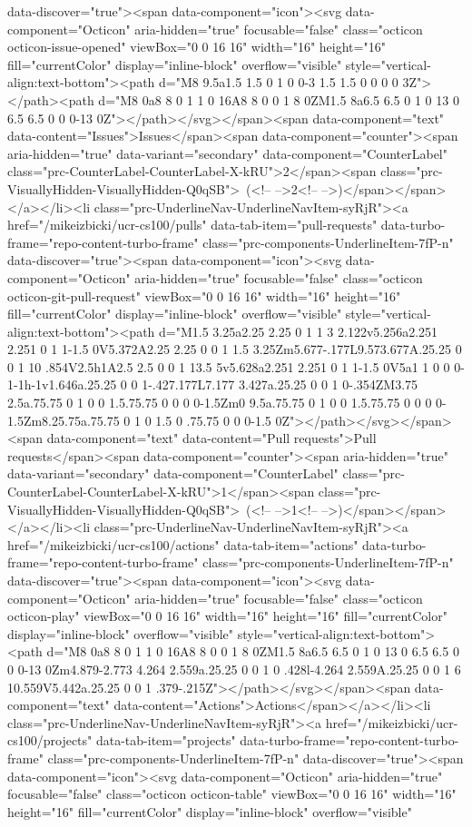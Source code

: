 data-discover="true"><span data-component="icon"><svg data-component="Octicon" aria-hidden="true" focusable="false" class="octicon octicon-issue-opened" viewBox="0 0 16 16" width="16" height="16" fill="currentColor" display="inline-block" overflow="visible" style="vertical-align:text-bottom"><path d="M8 9.5a1.5 1.5 0 1 0 0-3 1.5 1.5 0 0 0 0 3Z"></path><path d="M8 0a8 8 0 1 1 0 16A8 8 0 0 1 8 0ZM1.5 8a6.5 6.5 0 1 0 13 0 6.5 6.5 0 0 0-13 0Z"></path></svg></span><span data-component="text" data-content="Issues">Issues</span><span data-component="counter"><span aria-hidden="true" data-variant="secondary" data-component="CounterLabel" class="prc-CounterLabel-CounterLabel-X-kRU">2</span><span class="prc-VisuallyHidden-VisuallyHidden-Q0qSB"> (<!-- -->2<!-- -->)</span></span></a></li><li class="prc-UnderlineNav-UnderlineNavItem-syRjR"><a href="/mikeizbicki/ucr-cs100/pulls" data-tab-item="pull-requests" data-turbo-frame="repo-content-turbo-frame" class="prc-components-UnderlineItem-7fP-n" data-discover="true"><span data-component="icon"><svg data-component="Octicon" aria-hidden="true" focusable="false" class="octicon octicon-git-pull-request" viewBox="0 0 16 16" width="16" height="16" fill="currentColor" display="inline-block" overflow="visible" style="vertical-align:text-bottom"><path d="M1.5 3.25a2.25 2.25 0 1 1 3 2.122v5.256a2.251 2.251 0 1 1-1.5 0V5.372A2.25 2.25 0 0 1 1.5 3.25Zm5.677-.177L9.573.677A.25.25 0 0 1 10 .854V2.5h1A2.5 2.5 0 0 1 13.5 5v5.628a2.251 2.251 0 1 1-1.5 0V5a1 1 0 0 0-1-1h-1v1.646a.25.25 0 0 1-.427.177L7.177 3.427a.25.25 0 0 1 0-.354ZM3.75 2.5a.75.75 0 1 0 0 1.5.75.75 0 0 0 0-1.5Zm0 9.5a.75.75 0 1 0 0 1.5.75.75 0 0 0 0-1.5Zm8.25.75a.75.75 0 1 0 1.5 0 .75.75 0 0 0-1.5 0Z"></path></svg></span><span data-component="text" data-content="Pull requests">Pull requests</span><span data-component="counter"><span aria-hidden="true" data-variant="secondary" data-component="CounterLabel" class="prc-CounterLabel-CounterLabel-X-kRU">1</span><span class="prc-VisuallyHidden-VisuallyHidden-Q0qSB"> (<!-- -->1<!-- -->)</span></span></a></li><li class="prc-UnderlineNav-UnderlineNavItem-syRjR"><a href="/mikeizbicki/ucr-cs100/actions" data-tab-item="actions" data-turbo-frame="repo-content-turbo-frame" class="prc-components-UnderlineItem-7fP-n" data-discover="true"><span data-component="icon"><svg data-component="Octicon" aria-hidden="true" focusable="false" class="octicon octicon-play" viewBox="0 0 16 16" width="16" height="16" fill="currentColor" display="inline-block" overflow="visible" style="vertical-align:text-bottom"><path d="M8 0a8 8 0 1 1 0 16A8 8 0 0 1 8 0ZM1.5 8a6.5 6.5 0 1 0 13 0 6.5 6.5 0 0 0-13 0Zm4.879-2.773 4.264 2.559a.25.25 0 0 1 0 .428l-4.264 2.559A.25.25 0 0 1 6 10.559V5.442a.25.25 0 0 1 .379-.215Z"></path></svg></span><span data-component="text" data-content="Actions">Actions</span></a></li><li class="prc-UnderlineNav-UnderlineNavItem-syRjR"><a href="/mikeizbicki/ucr-cs100/projects" data-tab-item="projects" data-turbo-frame="repo-content-turbo-frame" class="prc-components-UnderlineItem-7fP-n" data-discover="true"><span data-component="icon"><svg data-component="Octicon" aria-hidden="true" focusable="false" class="octicon octicon-table" viewBox="0 0 16 16" width="16" height="16" fill="currentColor" display="inline-block" overflow="visible" 